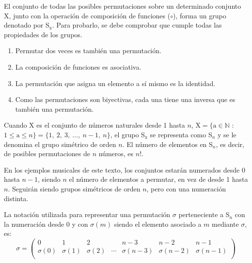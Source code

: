 		El conjunto de todas las posibles permutaciones sobre un determinado conjunto X, junto con la operación de composición de funciones ($\circ$), forma un grupo denotado por S$_\text{x}$. Para probarlo, se debe comprobar que cumple todas las propiedades de los grupos.

		\begin{enumerate}
			\item{Permutar dos veces es también una permutación.}
			\item{La composición de funciones es asociativa.}
			\item{La permutación que asigna un elemento a sí mismo es la identidad.}
			\item{Como las permutaciones son biyectivas, cada una tiene una inversa que es también una permutación.}		
		\end{enumerate}

		Cuando X es el conjunto de números naturales desde 1 hasta $n$, $\text{X} = \{ \text{a} \in \mathbb{N}$ : $1\le \text{a}\le n\} = \{ 1,\ 2,\ 3,\ \ldots,\ n-1,\ n\}$, el grupo S$_\text{x}$ se representa como S$_n$ y se le denomina el grupo simétrico de orden $n$. El número de elementos en S$_n$, es decir, de posibles permutaciones de $n$ números, es $n!$. 
		
		En los ejemplos musicales de este texto, los conjuntos estarán numerados desde 0 hasta $n-1$, siendo $n$ el número de elementos a permutar, en vez de desde 1 hasta $n$. Seguirán siendo grupos simétricos de orden $n$, pero con una numeración distinta.
		
		La notación utilizada para representar una permutación $\sigma$ perteneciente a S$_n$ con la numeración desde 0 y con $\sigma(m)$ siendo el elemento asociado a $m$ mediante $\sigma$, es:
		$$\sigma=\left(\begin{matrix}0&1&2&&n-3&n-2&n-1\\\sigma\left(0\right)&\sigma\left(1\right)&\sigma\left(2\right)&\cdots&\sigma\left(n-3\right)&\sigma\left(n-2\right)&\sigma\left(n-1\right)\\\end{matrix}\right)$$